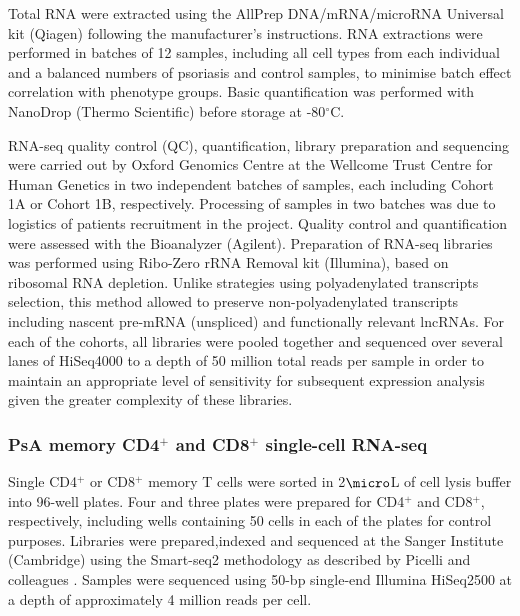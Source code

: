 Total RNA were extracted using the AllPrep DNA/mRNA/microRNA Universal kit (Qiagen) following the manufacturer's instructions. RNA extractions were performed in batches of 12 samples, including all cell types from each individual and a balanced numbers of psoriasis and control samples, to minimise batch effect correlation with phenotype groups. Basic quantification was performed with NanoDrop (Thermo Scientific) before storage at -80{$^\circ$}C.

RNA-seq quality control (QC), quantification, library preparation and sequencing were carried out by Oxford Genomics Centre at the Wellcome Trust Centre for Human Genetics in two independent batches of samples, each including Cohort 1A or Cohort 1B, respectively. Processing of samples in two batches was due to logistics of patients recruitment in the project. Quality control and quantification were assessed with the Bioanalyzer (Agilent). Preparation of RNA-seq libraries was performed using Ribo-Zero rRNA Removal kit (Illumina), based on ribosomal RNA depletion. Unlike strategies using polyadenylated transcripts selection, this method allowed to preserve non-polyadenylated transcripts including nascent pre-mRNA (unspliced) and functionally relevant lncRNAs. For each of the cohorts, all libraries were pooled together and  sequenced over several lanes of HiSeq4000 to a depth of 50 million total reads per sample in order to maintain an appropriate level of sensitivity for subsequent expression analysis given the greater complexity of these libraries.

 

\subsubsection{PsA memory CD4$^{+}$ and CD8$^{+}$ single-cell RNA-seq} 
\label{scRNA_processing}

Single CD4$^{+}$ or CD8$^{+}$ memory T cells were sorted in 2$\micro$L of cell lysis buffer into 96-well plates. Four and three plates were prepared for CD4$^{+}$ and CD8$^{+}$, respectively, including wells containing 50 cells in each of the plates for control purposes. Libraries were prepared,indexed and sequenced at the Sanger Institute (Cambridge) using the Smart-seq2 methodology as described by Picelli and colleagues \parencite{Picelli2014}. Samples were sequenced using 50-bp single-end Illumina HiSeq2500 at a depth of approximately 4 million reads per cell. %

